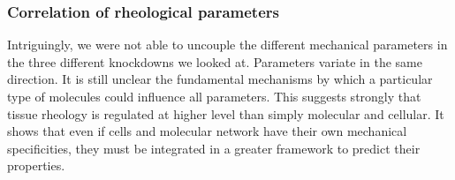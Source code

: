 \subsubsection{Correlation of rheological parameters}
Intriguingly, we were not able to uncouple the different mechanical parameters in the three different knockdowns we looked at.
Parameters variate in the same direction.
It is still unclear the fundamental mechanisms by which a particular type of molecules could influence all parameters.
This suggests strongly that tissue rheology is regulated at higher level than simply molecular and cellular.
It shows that even if cells and molecular network have their own mechanical specificities, they must be integrated in a greater framework to predict their properties.
